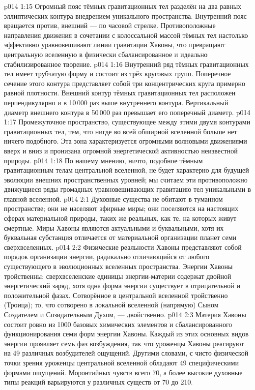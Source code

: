 \vs p014 1:15 Огромный пояс тёмных гравитационных тел разделён на два равных эллиптических контура внедрением уникального пространства. Внутренний пояс вращается против, внешний --- по часовой стрелке. Противоположные направления движения в сочетании с колоссальной массой тёмных тел настолько эффективно уравновешивают линии гравитации Хавоны, что превращают центральную вселенную в физически сбалансированное и идеально стабилизированное творение.
\vs p014 1:16 Внутренний ряд тёмных гравитационных тел имеет трубчатую форму и состоит из трёх круговых групп. Поперечное сечение этого контура представляет собой три концентрических круга примерно равной плотности. Внешний контур тёмных гравитационных тел расположен перпендикулярно и в 10\,000 раз выше внутреннего контура. Вертикальный диаметр внешнего контура в 50\,000 раз превышает его поперечный диаметр.
\vs p014 1:17 Промежуточное пространство, существующее между этими двумя контурами гравитационных тел,  тем, что нигде во всей обширной вселенной больше нет ничего подобного. Эта зона характеризуется огромными волновыми движениями вверх и вниз и пронизана огромной энергетической активностью неизвестной природы.
\vs p014 1:18 По нашему мнению, ничто, подобное тёмным гравитационным телам центральной вселенной, не будет характерно для будущей эволюции внешних пространственных уровней; мы считаем эти противоположно движущиеся ряды громадных уравновешивающих гравитацию тел уникальными в главной вселенной.
\vs p014 2:1 Духовные существа не обитают в туманном пространстве; они не населяют эфирные миры; они поселяются на настоящих сферах материальной природы, таких же реальных, как те, на которых живут смертные. Миры Хавоны являются актуальными и буквальными, хотя их буквальная субстанция отличается от материальной организации планет семи сверхвселенных.
\vs p014 2:2 Физические реальности Хавоны представляют собой порядок организации энергии, радикально отличающийся от любого существующего в эволюционных вселенных пространства. Энергии Хавоны тройственны; сверхвселенские единицы энергии\hyp{}материи содержат двойной энергетический заряд, хотя одна форма энергии существует в отрицательной и положительной фазах. Сотворённое в центральной вселенной тройственно (Троица); то, что сотворено в локальной вселенной (напрямую) Сыном Создателем и Созидательным Духом, --- двойственно.
\vs p014 2:3 Материя Хавоны состоит ровно из 1000 базовых химических элементов и сбалансированного функционирования семи форм энергии Хавоны. Каждый из этих основных видов энергии проявляет семь фаз возбуждения, так что уроженцы Хавоны реагируют на 49 различных возбудителей ощущений. Другими словами, с чисто физической точки зрения уроженцы центральной вселенной обладают 49 специфическими формами ощущений. Моронтийных чувств всего 70, а более высокие духовные типы реакций варьируются у различных существ от 70 до 210.
